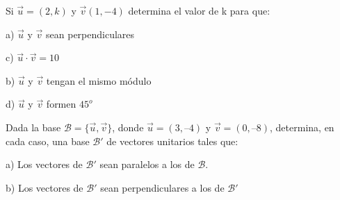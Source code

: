 \vspace{-8mm}
\begin{flushright}
\begin{footnotesize} \textcolor{gris}{}	\end{footnotesize}
\end{flushright}


\begin{mipropuesto}

Si $\vec u=(2, k)$ y $\vec v(1, -4)$ determina el valor de k para que: 

\begin{multicols}{2} a) $\vec u$ y $\vec v$ sean perpendiculares

c) $\vec u \cdot \vec v=10$	

b) $\vec u$ y $\vec v$ tengan el mismo módulo

d)  $\vec u$ y $\vec v$  formen $45^o$ \end{multicols}
\end{mipropuesto}

\vspace{-8mm}
\begin{flushright}
\begin{footnotesize} \textcolor{gris}{}	\end{footnotesize}
\end{flushright}


\begin{mipropuesto}

Dada la base $\mathcal B = \{ \vec u, \vec v\}$,  donde $\vec u=(3, –4)$ y $\vec v=(0, –8)$, determina, en cada caso, una base $\mathcal B'$ de vectores unitarios tales que:

\vspace{2mm} 
a) Los vectores de $\mathcal B'$ sean paralelos a los de $\mathcal B$.

b) Los vectores de $\mathcal B'$ sean perpendiculares a los de $\mathcal B'$ 	
\end{mipropuesto}

\vspace{-8mm}
\begin{flushright}
\begin{footnotesize} \textcolor{gris}{}	\end{footnotesize}
\end{flushright}



